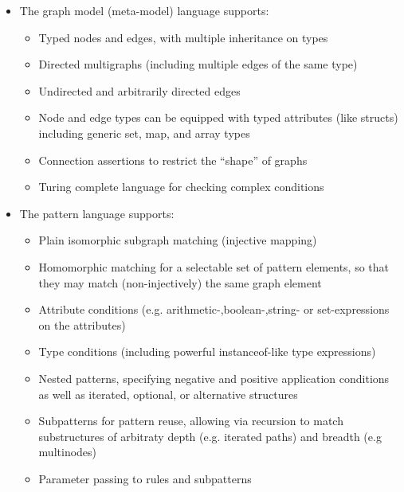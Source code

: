 \begin{itemize}
  \item The graph model (meta-model) language supports:
  \begin{itemize}
    \item Typed nodes and edges, with multiple inheritance on types
    \item Directed multigraphs (including multiple edges of the same type)
    \item Undirected and arbitrarily directed edges
    \item Node and edge types can be equipped with typed attributes (like structs) including generic set, map, and array types
    \item Connection assertions to restrict the ``shape'' of graphs
    \item Turing complete language for checking complex conditions
  \end{itemize}

  \item The pattern language supports:
  \begin{itemize}
    \item Plain isomorphic subgraph matching (injective mapping)
    \item Homomorphic matching for a selectable set of pattern elements, so that they may match (non-injectively) the same graph element
    \item Attribute conditions (e.g. arithmetic-,boolean-,string- or set-expressions on the attributes)
    \item Type conditions (including powerful instanceof-like type expressions)
    \item Nested patterns, specifying negative and positive application conditions as well as iterated, optional, or alternative structures
    \item Subpatterns for pattern reuse, allowing via recursion to match substructures of arbitraty depth (e.g. iterated paths) and breadth (e.g multinodes)
    \item Parameter passing to rules and subpatterns
  \end{itemize}


\end{itemize}
